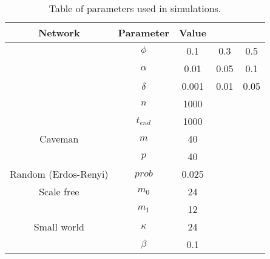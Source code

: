 \begin{table}[ht]
\caption{Table of parameters used in simulations.} %
\centering %
\begin{tabular}{c c c c c} %
\hline\hline %
Network & Parameter & Value\\ [0.5ex] %
\hline %
\,& $\phi$ & 0.1 & 0.3 & 0.5 \\
\,& $\alpha$ & 0.01 & 0.05 & 0.1\\
\,& $\delta$ & 0.001& 0.01 & 0.05\\
\,& $n$ & 1000\\
\,& $t_{end}$ & 1000\\
\hline
Caveman & $m$& 40 \\ %
\,& $p$ & 40\\
\hline
Random (Erdos-Renyi) & $prob$ & 0.025 \\
\hline
Scale free & $m_0$ & 24\\
\,& $m_1$ & 12\\
\hline
Small world & $\kappa$& 24 \\
\,& $\beta$ & 0.1\\ [1ex] %
\hline %
\end{tabular}
\label{Tab1} %
\end{table}


